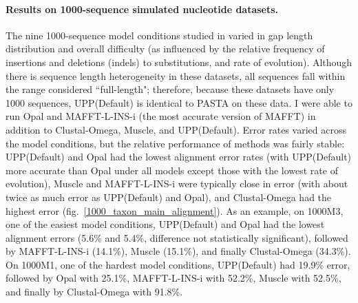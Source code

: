 \paragraph{Results on 1000-sequence simulated 
nucleotide datasets. }
The nine 1000-sequence model  
conditions 
studied in \cite{Liu2009,Liu2012} varied in
gap length distribution
 and overall difficulty
(as influenced by the relative
frequency of insertions and deletions (indels) to substitutions, and rate of evolution).
Although there is sequence length heterogeneity in
these  datasets, all sequences fall within the
range considered ``full-length"; therefore, because
these datasets have only 1000 sequences,
UPP(Default) is identical to PASTA on these data.
I were able to
run    Opal and MAFFT-L-INS-i (the most accurate
version of MAFFT)
in addition to Clustal-Omega, Muscle, 
and UPP(Default).  
Error rates varied across the model
conditions, 
but the relative performance of methods
was fairly stable:
UPP(Default) and Opal had the lowest
alignment error rates (with UPP(Default)
more accurate than Opal under 
all models except those with the lowest
rate of evolution), 
Muscle and MAFFT-L-INS-i were typically
close in error (with  about twice 
as much error as UPP(Default) and Opal),
and Clustal-Omega had the highest error
(fig.~\ref{1000_taxon_main_alignment}).
As an example, on 1000M3, one of the easiest model conditions,
UPP(Default) and Opal had
the lowest alignment errors (5.6\% and 5.4\%,
difference not statistically significant),  %
followed by MAFFT-L-INS-i (14.1\%), Muscle (15.1\%),
and finally Clustal-Omega (34.3\%).
On 1000M1, one of the hardest model conditions,
UPP(Default) had  19.9\% error, followed 
by Opal with 25.1\%, MAFFT-L-INS-i with 52.2\%,
Muscle with 52.5\%, 
and finally by Clustal-Omega with 91.8\%.


